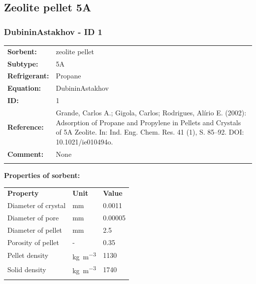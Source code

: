 \subsection{Zeolite pellet 5A}
%
\subsubsection{DubininAstakhov - ID 1}
%
\begin{tabular}[l]{|lp{11.5cm}|}
\hline
\addlinespace

\textbf{Sorbent:} & zeolite pellet \\
\textbf{Subtype:} & 5A \\
\textbf{Refrigerant:} & Propane \\
\textbf{Equation:} & DubininAstakhov \\
\textbf{ID:} & 1 \\
\textbf{Reference:} & Grande, Carlos A.; Gigola, Carlos; Rodrigues, Alírio E. (2002): Adsorption of Propane and Propylene in Pellets and Crystals of 5A Zeolite. In: Ind. Eng. Chem. Res. 41 (1), S. 85–92. DOI: 10.1021/ie010494o. \\
\textbf{Comment:} & None \\

\addlinespace
\hline
\end{tabular}
\newline

\textbf{Properties of sorbent:}
\newline
%
\begin{longtable}[l]{lll}
\toprule
\addlinespace
\textbf{Property} & \textbf{Unit} & \textbf{Value} \\
\addlinespace
\midrule
\endhead
\bottomrule
\endfoot
\bottomrule
\endlastfoot
\addlinespace

Diameter of crystal & \si{\milli\meter} & 0.0011\\
Diameter of pore & \si{\milli\meter} & 0.00005\\
Diameter of pellet & \si{\milli\meter} & 2.5\\
Porosity of pellet & - & 0.35\\
Pellet density & \si{\kilogram\per\cubic\meter} & 1130\\
Solid density & \si{\kilogram\per\cubic\meter} & 1740\\

\addlinespace\end{longtable}

